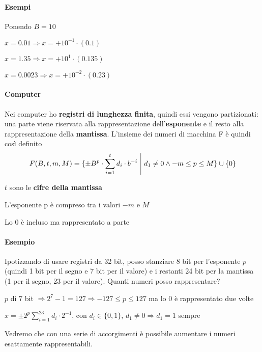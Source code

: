 \documentclass[10pt]{book}
\begin{document}
\paragraph{Esempi} Ponendo $B = 10$
\begin{list}{}{}
	\item $x = 0.01 \Rightarrow x = +10^{-1}\cdot(0.1)$
	\item $x = 1.35 \Rightarrow x = +10^1\cdot(0.135)$
	\item $x = 0.0023 \Rightarrow x = +10^{-2}\cdot(0.23)$
\end{list}
\paragraph{Computer} Nei computer ho \textbf{registri di lunghezza finita}, quindi essi vengono partizionati: una parte viene riservata alla rappresentazione dell'\textbf{esponente} e il resto alla rappresentazione della \textbf{mantissa}. L'insieme dei numeri di macchina F è quindi così definito
$$F(B, t, m, M) = \{\pm B^p \cdot \sum_{i=1}^t d_i \cdot b^{-i}\:\:\vline\:\: d_1 \neq 0 \wedge -m \leq p \leq M\} \cup \{0\}$$
\begin{list}{}{dove}
	\item $t$ sono le \textbf{cifre della mantissa}
	\item L'esponente p è compreso tra i valori $-m$ e $M$
	\item Lo 0 è incluso ma rappresentato a parte
\end{list}
\paragraph{Esempio} Ipotizzando di usare registri da 32 bit, posso stanziare 8 bit per l'esponente $p$ (quindi 1 bit per il segno e 7 bit per il valore) e i restanti 24 bit per la mantissa (1 per il segno, 23 per il valore). Quanti numeri posso rappresentare?
\begin{list}{}{}
	\item $p$ di 7 bit $\Rightarrow 2^7 - 1 = 127 \Rightarrow -127 \leq p \leq 127$ ma lo 0 è rappresentato due volte
	\item $x = \pm2^p \sum_{i=1}^23 d_i \cdot 2^{-1}$, con $d_i \in \{0, 1\}$, $d_1 \neq 0 \Rightarrow d_1 = 1$ sempre
\end{list}
Vedremo che con una serie di accorgimenti è possibile aumentare i numeri esattamente rappresentabili.
\end{document}
